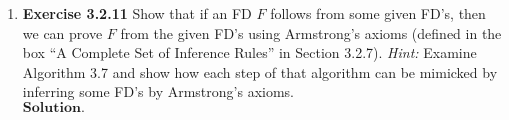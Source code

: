 \documentclass{article}
\theoremstyle{remark}
\begin{document}
\begin{enumerate}
    For $R_2$ we have that $C^+ \neq C$ and $D^+ \neq D$ and that $(CD)^+ \neq CD$, since these are not closed.
    We then see that $CD$ is a superkey by seeing that since
    \begin{center}
        $CD \longrightarrow C$, $CD \longrightarrow D$, $C \longrightarrow X$, $D \longrightarrow Y$ (with $X$ and $Y$ not necessarily different),
    \end{center}
    then 
    \begin{center}
        $CD \longrightarrow XY$.
    \end{center}
    And if $XY = X$, then since $(CD)^+ = CDX$, but since $CDX$ is not closed, by transitivity $(CD)^+ = CDXZ = ABCD$.
    Then, the FD's for $R_2$ will be of the form $\{C \longrightarrow D, D\longrightarrow A\}$, $\{C \longrightarrow A, D \longrightarrow B\}$ 
    or $\{C \longrightarrow A, D\longrightarrow A, CD \longrightarrow B\}$.
    \begin{flushright}
        \qed
    \end{flushright}

    \item \textbf{Exercise 3.2.11} Show that if an FD \( F \) follows from some given FD’s, then we can prove \( F \) 
    from the given FD's using Armstrong's axioms (defined in the box ``A Complete Set of Inference Rules'' in Section 3.2.7). \textit{Hint:} Examine Algorithm 3.7 and show how each step of that algorithm can be mimicked by inferring some FD’s by Armstrong’s axioms.\\
    $\textbf{Solution.}$
    
\end{enumerate}
\end{document}
